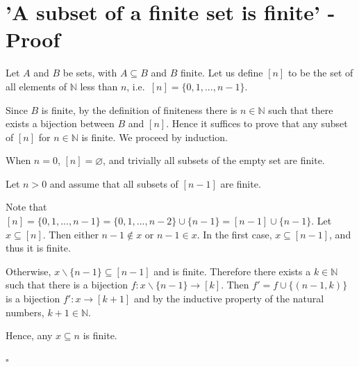 \documentclass[11pt,journal]{IEEEtran}
\begin{document}
\section{'A subset of a finite set is finite' - Proof}
Let $A$ and $B$ be sets, with $A \subseteq B$ and $B$ finite. Let us define $[n]$ to be the set of all elements of $\mathbb{N}$ less than $n$, i.e.~$[n] = \{0,1,...,n-1\}$.

Since $B$ is finite, by the definition of finiteness there is $n \in \mathbb{N}$ such that there exists a bijection between $B$ and $[n]$. Hence it suffices to prove that any subset of $[n]$ for $n \in \mathbb{N}$ is finite. We proceed by induction.

When $n = 0$, $[n] = \varnothing$, and trivially all subsets of the empty set are finite.

Let $n > 0$ and assume that all subsets of $[n-1]$ are finite. 

Note that $[n] = \{0,1,...,n-1\} = \{0,1,...,n-2\} \cup \{n-1\} = [n-1] \cup \{n-1\}$. Let $x \subseteq [n]$. Then either $n-1 \notin x$ or $n-1\in x$. In the first case, $x \subseteq [n-1]$, and thus it is finite.

Otherwise, $x\backslash\{n-1\} \subseteq [n-1]$ and is finite. Therefore there exists a $k \in \mathbb{N}$ such that there is a bijection $f: x\backslash\{n-1\} \rightarrow [k]$. Then $f' = f \cup \{(n-1, k)\}$ is a bijection $f': x \rightarrow [k+1]$ and by the inductive property of the natural numbers, $k+1 \in \mathbb{N}$.

Hence, any $x \subseteq n$ is finite.

$\square$
	
\end{document}
